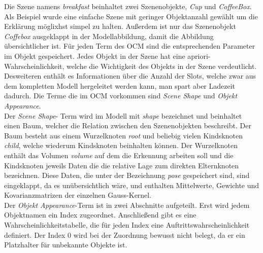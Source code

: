 Die Szene namens \textit{breakfast} beinhaltet zwei Szenenobjekte, \textit{Cup} und \textit{CoffeeBox}. Als Beispiel wurde eine einfache Szene mit geringer Objektanzahl gewählt um die Erklärung möglixhst simpel zu halten. Außerdem ist nur das Szenenobjekt \textit{Coffebox} ausgeklappt in der Modellabbildung, damit die Abbildung übersichtlicher ist. Für jeden Term des OCM sind die entsprechenden Parameter im Objekt gespeichert. Jedes Objekt in der Szene hat eine apriori-Wahrscheinlichkeit, welche die Wichtigkeit des Objekts in der Szene verdeutlicht. Desweiteren enthält es Informationen über die Anzahl der Slots, welche zwar aus dem kompletten Modell hergeleitet werden kann, man spart aber Ladezeit dadurch. Die Terme die im OCM vorkommen sind \textit{Scene Shape} und \textit{Objekt Appearance}.\smallskip\\
Der \textit{Scene Shape}- Term wird im Modell mit \textit{shape} bezeichnet und beinhaltet einen Baum, welcher die Relation zwischen den Szenenobjekten beschreibt. Der Baum besteht aus einem Wurzelknoten \textit{root} und beliebig vielen Kindsknoten \textit{child}, welche wiederum Kindsknoten beinhalten können. Der Wurzelknoten enthält das Volumen \textit{volume} auf dem die Erkennung arbeiten soll und die Kindsknoten jeweils Daten die die relative Lage zum direkten Elternknoten bezeichnen. Diese Daten, die unter der Bezeichnung \textit{pose} gespeichert sind, sind eingeklappt, da es unübersichtlich wäre, und enthalten Mittelwerte, Gewichte und Kovarianzmatrizen der einzelnen Gauss-Kernel.\smallskip\\
Der \textit{Objekt Appearance}-Term ist in zwei Abschnitte aufgeteilt. Erst wird jedem Objektnamen ein Index zugeordnet. Anschließend gibt es eine Wahrscheinlichkeitstabelle, die für jeden Index eine Auftrittswahrscheinlichkeit definiert. Der Index 0 wird bei der Zuordnung bewusst nicht belegt, da er ein Platzhalter für unbekannte Objekte ist.
\begin{deprecated}
\cite{gehrung14}
\end{deprecated}

